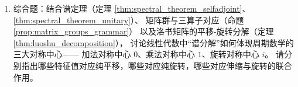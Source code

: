 \begin{enumerate}[leftmargin=3em, label=\textbf{题 \arabic*}]
    \item 综合题：结合谱定理（定理 \ref{thm:spectral_theorem_selfadjoint}、\ref{thm:spectral_theorem_unitary}）、
    矩阵群与三算子对应（命题 \ref{prop:matrix_groups_grammar}）
    以及洛书矩阵的平移-旋转分解（定理 \ref{thm:luoshu_decomposition}），
    讨论线性代数中“谱分解”如何体现周期数学的三大对称中心——
    加法对称中心 $0$、乘法对称中心 $1$、旋转对称中心 $i$。
    请分别指出哪些特征值对应纯平移，哪些对应纯旋转，哪些对应伸缩与旋转的联合作用。
\end{enumerate}

